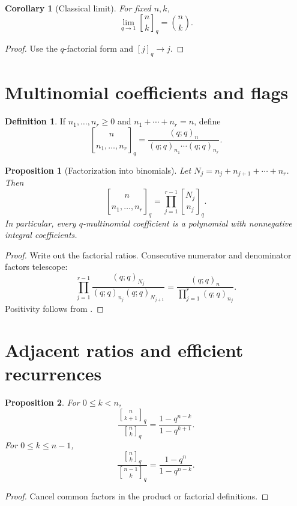 \documentclass[11pt,oneside,openany]{book}
\newtheorem{proposition}[proposition]{Proposition}
\newtheorem{corollary}[corollary]{Corollary}
\theoremstyle{definition}
\newtheorem{definition}[definition]{Definition}
\theoremstyle{remark}
\newcommand{\qbinom}[2]{\genfrac{[}{]}{0pt}{}{#1}{#2}_{q}}
\begin{document}
\begin{corollary}[Classical limit]\label{cor:qbinom-classical}
For fixed $n,k$,
\[
 \lim_{q\to1}\qbinom nk=\binom nk.
\]
\end{corollary}

\begin{proof}
Use the $q$-factorial form and $[j]_q\to j$.
\end{proof}

\section{Multinomial coefficients and flags}

\begin{definition}
If $n_1,\dots,n_r\ge0$ and $n_1+\cdots+n_r=n$, define
\[
 \genfrac{[}{]}{0pt}{}{n}{n_1,\ldots,n_r}_q
 =\frac{(q;q)_n}{(q;q)_{n_1}\cdots(q;q)_{n_r}}.
\]
\end{definition}

\begin{proposition}[Factorization into binomials]\label{prop:qmult-factor}
Let $N_j=n_j+n_{j+1}+\cdots+n_r$.  Then
\[
 \genfrac{[}{]}{0pt}{}{n}{n_1,\ldots,n_r}_q
 =\prod_{j=1}^{r-1}\genfrac{[}{]}{0pt}{}{N_j}{n_j}_q.
\]
In particular, every $q$-multinomial coefficient is a polynomial with nonnegative integral coefficients.
\end{proposition}

\begin{proof}
Write out the factorial ratios.  Consecutive numerator and denominator factors telescope:
\[
 \prod_{j=1}^{r-1}
 \frac{(q;q)_{N_j}}{(q;q)_{n_j}(q;q)_{N_{j+1}}}
 =\frac{(q;q)_n}{\prod_{j=1}^{r}(q;q)_{n_j}}.
\]
Positivity follows from .
\end{proof}

\section{Adjacent ratios and efficient recurrences}

\begin{proposition}\label{prop:adjacent-ratio}
For $0\le k<n$,
\[
 \frac{\qbinom n{k+1}}{\qbinom nk}
 =\frac{1-q^{n-k}}{1-q^{k+1}}.
\]
For $0\le k\le n-1$,
\[
 \frac{\qbinom n k}{\qbinom{n-1}k}
 =\frac{1-q^n}{1-q^{n-k}}.
\]
\end{proposition}

\begin{proof}
Cancel common factors in the product or factorial definitions.
\end{proof}
\end{document}
